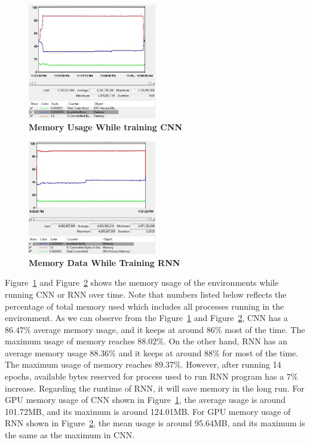 \documentclass[letterpaper]{article} %
\begin{document}
	\begin{figure}[h!]
		\centering
		\includegraphics[width=0.5\textwidth]{CNN_Memory_Data.jpg}
		\caption{\textbf{Memory Usage While training CNN}}
		\label{fig:cnn_mem}
	\end{figure}
	\begin{figure}[h!]
		\centering
		\includegraphics[width=0.5\textwidth]{RNN_Memory_Data.jpg}
		\caption{\textbf{Memory Data While Training RNN}}
		\label{fig:rnn_mem}
	\end{figure}
	
	Figure~\ref{fig:cnn_mem} and Figure~\ref{fig:rnn_mem} shows the memory usage of the environments while running CNN or RNN over time. Note that numbers listed below reflects the percentage of total memory used which includes all processes running in the environment. As we can observe from the Figure~\ref{fig:cnn_mem} and Figure~\ref{fig:rnn_mem}, CNN has a $86.47\%$ average memory usage, and it keeps at around $86\%$ most of the time. The maximum usage of memory reaches $88.02\%$. On the other hand, RNN has an average memory usage $88.36\%$ and it keeps at around $88\%$ for most of the time. The maximum usage of memory reaches $89.37\%$. However, after running 14 epochs, available bytes reserved for process used to run RNN program has a $7\%$ increase. Regarding the runtime of RNN, it will save memory in the long run. For GPU memory usage of CNN shown in Figure~\ref{fig:cnn_mem}, the average usage is around 101.72MB, and its maximum is around 124.01MB. For GPU memory usage of RNN shown in Figure~\ref{fig:rnn_mem}, the mean usage is around 95.64MB, and its maximum is the same as the maximum in CNN.
	
\end{document}
